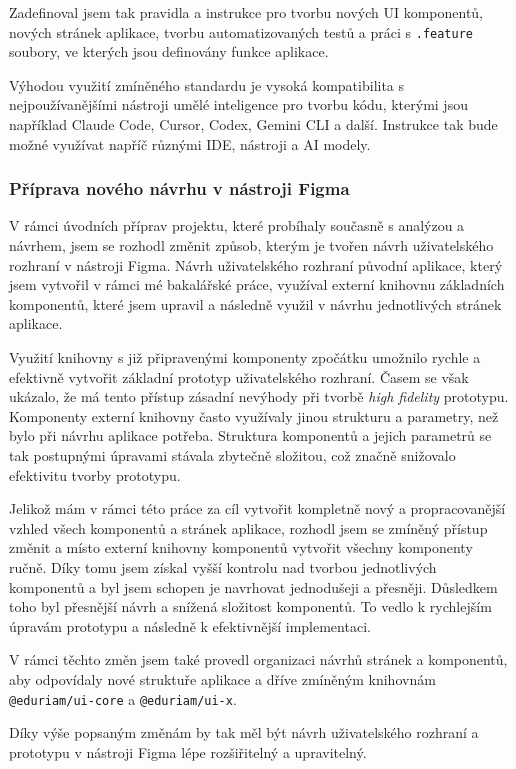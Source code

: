 Zadefinoval jsem tak pravidla a instrukce pro tvorbu nových UI komponentů, nových stránek aplikace, tvorbu automatizovaných testů a práci s \texttt{.feature} soubory, ve kterých jsou definovány funkce aplikace.

Výhodou využití zmíněného standardu je vysoká kompatibilita s nejpoužívanějšími nástroji umělé inteligence pro tvorbu kódu, kterými jsou například Claude Code, Cursor, Codex, Gemini CLI a další. Instrukce tak bude možné využívat napříč různými IDE, nástroji a AI modely. \cite{AgentSkills}

\subsubsection{Příprava nového návrhu v nástroji Figma}

V rámci úvodních příprav projektu, které probíhaly současně s analýzou a návrhem, jsem se rozhodl změnit způsob, kterým je tvořen návrh uživatelského rozhraní v nástroji Figma. Návrh uživatelského rozhraní původní aplikace, který jsem vytvořil v rámci mé bakalářské práce, využíval externí knihovnu základních komponentů, které jsem upravil a následně využil v návrhu jednotlivých stránek aplikace.

Využití knihovny s již připravenými komponenty zpočátku umožnilo rychle a efektivně vytvořit základní prototyp uživatelského rozhraní. Časem se však ukázalo, že má tento přístup zásadní nevýhody při tvorbě \textit{high fidelity} prototypu. Komponenty externí knihovny často využívaly jinou strukturu a parametry, než bylo při návrhu aplikace potřeba. Struktura komponentů a jejich parametrů se tak postupnými úpravami stávala zbytečně složitou, což značně snižovalo efektivitu tvorby prototypu.

Jelikož mám v rámci této práce za cíl vytvořit kompletně nový a propracovanější vzhled všech komponentů a stránek aplikace, rozhodl jsem se zmíněný přístup změnit a místo externí knihovny komponentů vytvořit všechny komponenty ručně. Díky tomu jsem získal vyšší kontrolu nad tvorbou jednotlivých komponentů a byl jsem schopen je navrhovat jednodušeji a přesněji. Důsledkem toho byl přesnější návrh a snížená složitost komponentů. To vedlo k rychlejším úpravám prototypu a následně k efektivnější implementaci.

V rámci těchto změn jsem také provedl organizaci návrhů stránek a komponentů, aby odpovídaly nové struktuře aplikace a dříve zmíněným knihovnám \texttt{@eduriam/ui-core} a \texttt{@eduriam/ui-x}.

Díky výše popsaným změnám by tak měl být návrh uživatelského rozhraní a prototypu v nástroji Figma lépe rozšiřitelný a upravitelný.
